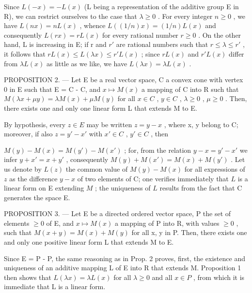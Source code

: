 Since \(L(-x) = -L(x)\) (L being a representation of the additive group E in R), we can restrict ourselves to the case that \(\lambda \geqslant 0\) . For every integer \(n \geqslant 0\) , we have \(L(nx) = nL(x)\) , whence \(L((1/n)x) = (1/n)L(x)\) and consequently \(L(rx) = rL(x)\) for every rational number \(r \geqslant 0\) . On the other hand, L is increasing in E; if r and \(r'\) are rational numbers such that \(r \leqslant \lambda \leqslant r'\) , it follows that \(rL(x) \leqslant L(\lambda x) \leqslant r'L(x)\) ; since \(rL(x)\) and \(r'L(x)\) differ from \(\lambda L(x)\) as little as we like, we have \(L(\lambda x) = \lambda L(x)\) .

PROPOSITION 2. --- Let E be a real vector space, C a convex cone with vertex 0 in E such that E = C - C, and \(x \mapsto M(x)\) a mapping of C into R such that \(M(\lambda x + \mu y) = \lambda M(x) + \mu M(y)\) for all \(x \in C\) , \(y \in C\) , \(\lambda \geqslant 0\) , \(\mu \geqslant 0\) . Then, there exists one and only one linear form L that extends M to E.

By hypothesis, every \(z \in E\) may be written \(z = y - x\) , where x, y belong to C; moreover, if also \(z = y' - x'\) with \(x' \in C\) , \(y' \in C\) , then

\(M(y) - M(x) = M(y') - M(x')\) ; for, from the relation \(y - x = y' - x'\) we infer \(y + x' = x + y'\) , consequently \(M(y) + M(x') = M(x) + M(y')\) . Let us denote by \(L(z)\) the common value of \(M(y) - M(x)\) for all expressions of \(z\) as the difference \(y - x\) of two elements of C; one verifies immediately that \(L\) is a linear form on E extending \(M\) ; the uniqueness of \(L\) results from the fact that C generates the space E.

PROPOSITION 3. --- Let E be a directed ordered vector space, P the set of elements \(\geqslant 0\) of E, and \(x \mapsto M(x)\) a mapping of P into R, with values \(\geqslant 0\) , such that \(M(x + y) = M(x) + M(y)\) for all x, y in P. Then, there exists one and only one positive linear form L that extends M to E.

Since E = P - P, the same reasoning as in Prop. 2 proves, first, the existence and uniqueness of an additive mapping L of E into R that extends M. Proposition 1 then shows that \(L(\lambda x) = \lambda L(x)\) for all \(\lambda \geqslant 0\) and all \(x \in P\) , from which it is immediate that L is a linear form.

